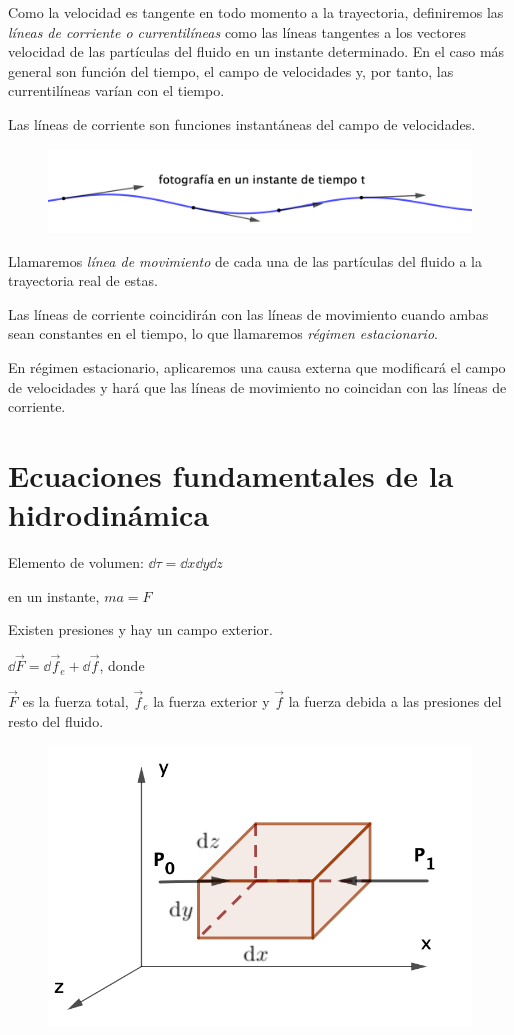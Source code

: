 Como la velocidad es tangente en todo momento a la trayectoria, definiremos las \emph{líneas de corriente o currentilíneas} como las líneas tangentes a los vectores velocidad de las partículas del fluido en un instante determinado. En el caso más general son función del tiempo, el campo de velocidades y, por tanto, las currentilíneas varían con el tiempo.

Las líneas de corriente son funciones instantáneas del campo de velocidades.

\begin{figure}[H]
	\centering
	\includegraphics[width=1\textwidth]{imagenes/imagenes18/T18IM01.png}
	\end{figure}

Llamaremos \emph{línea de movimiento} de cada una de las partículas del fluido a la trayectoria real de estas.

Las líneas de corriente coincidirán con las líneas de movimiento cuando ambas sean constantes en el tiempo, lo que llamaremos \emph{régimen estacionario}.

En régimen estacionario, aplicaremos una causa externa que modificará el campo de velocidades y hará que las líneas de movimiento no coincidan con las líneas de corriente.

\section{Ecuaciones fundamentales de la hidrodinámica}

\begin{multicols}{2}
Elemento de volumen: $\dd \tau=\dd x \dd y \dd z$

en un instante, $ma=F$

Existen presiones y hay un campo exterior.

$\dd \vec F=\dd \vec f_e+\dd \vec f$, donde

$\vec F$ es la fuerza total, $\vec f_e$ la fuerza exterior y $\vec f$ la fuerza debida a las presiones del resto del fluido.
\begin{figure}[H]
	\centering
	\includegraphics[width=.55\textwidth]{imagenes/imagenes18/T18IM02.png}
	\end{figure}	
\end{multicols}

